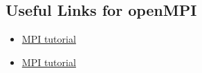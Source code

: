 \documentclass[11pt]{article}
\numberwithin{figure}{section}
\begin{document}
\subsection{Useful Links for openMPI}

\begin{itemize}
    \item \href{https://www.google.com/url?sa=t&rct=j&q=&esrc=s&source=web&cd=1&cad=rja&uact=8&ved=0ahUKEwiC3oqOga_aAhXCvY8KHXJYCqwQFggnMAA&url=http%3A%2F%2Fmpitutorial.com%2Ftutorials%2F&usg=AOvVaw3gcXG-8XhYsVPu5egCZ2EP} {MPI tutorial}

\item \href{http://mpitutorial.com/tutorials/mpi-hello-world/}{MPI tutorial}
\end{itemize}
\end{document}
